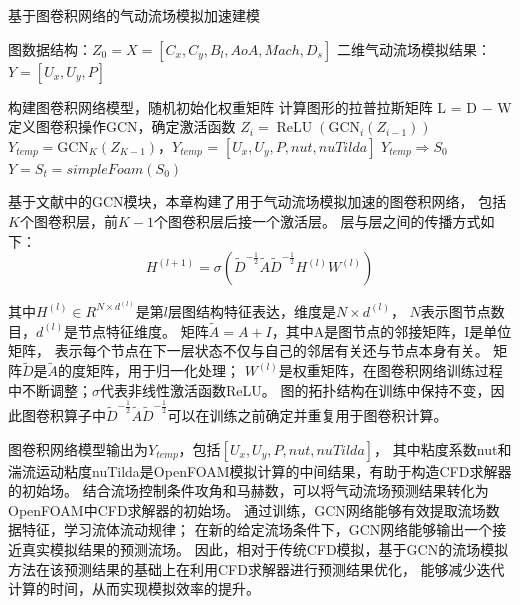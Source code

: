 \renewcommand{\algorithmicrequire}{\textbf{输入：}}
\renewcommand{\algorithmicensure}{\textbf{输出：}}
\begin{algorithm}[htbp]
	\caption{基于图卷积网络的气动流场模拟加速建模}
	\label{GCNflow}
	\begin{algorithmic}[1]
		\REQUIRE 图数据结构：$Z_{0} = X = [C_x, C_y, B_l, AoA, Mach, D_s]$ 
		\ENSURE  二维气动流场模拟结果：$Y = [ U_x,U_y, P]$
		
		\STATE 构建图卷积网络模型，随机初始化权重矩阵
		\STATE 计算图形的拉普拉斯矩阵 L = D − W
		\STATE 定义图卷积操作GCN，确定激活函数
		\STATE $Z_{i} = \operatorname{ReLU}\left(\mathrm{GCN}_{i}\left(Z_{i-1}\right)\right) $
		\ENDFOR
		\STATE $Y_{temp} = \mathrm{GCN}_{K}\left(Z_{K-1}\right)$，$Y_{temp}$ = $[ U_x,U_y, P, nut, nuTilda]$
		\STATE $Y_{temp} \Rightarrow S_0$ 
		\STATE $Y = S_t = simpleFoam(S_0)$  
	\end{algorithmic}
\end{algorithm}

基于文献\cite{2016Semi}中的GCN模块，本章构建了用于气动流场模拟加速的图卷积网络，
包括$K$个图卷积层，前$K-1$个图卷积层后接一个激活层。
层与层之间的传播方式如下：
\begin{equation}
H^{(l+1)}=\sigma\left(\tilde{D}^{-\frac{1}{2}} \tilde{A} \tilde{D}^{-\frac{1}{2}} H^{(l)} W^{(l)}\right)
\end{equation}

\noindent 其中$H^{(l)} \in R^{N \times d^{(l)}}$是第$l$层图结构特征表达，维度是$N \times d^{(l)}$，
$N$表示图节点数目，$d^{(l)}$是节点特征维度。
矩阵$\tilde{A} = A + I$，其中A是图节点的邻接矩阵，I是单位矩阵，
表示每个节点在下一层状态不仅与自己的邻居有关还与节点本身有关。
矩阵$\tilde{D}$是$\tilde{A}$的度矩阵，用于归一化处理；
$W^{(l)}$是权重矩阵，在图卷积网络训练过程中不断调整；$\sigma$代表非线性激活函数ReLU。
图的拓扑结构在训练中保持不变，因此图卷积算子中$\tilde{D}^{-\frac{1}{2}} \tilde{A} \tilde{D}^{-\frac{1}{2}}$可以在训练之前确定并重复用于图卷积计算。

图卷积网络模型输出为$Y_{temp}$，包括$[ U_x,U_y, P, nut, nuTilda]$，
其中粘度系数nut和湍流运动粘度nuTilda是OpenFOAM模拟计算的中间结果，有助于构造CFD求解器的初始场。
结合流场控制条件攻角和马赫数，可以将气动流场预测结果转化为OpenFOAM中CFD求解器的初始场。
通过训练，GCN网络能够有效提取流场数据特征，学习流体流动规律；
在新的给定流场条件下，GCN网络能够输出一个接近真实模拟结果的预测流场。
因此，相对于传统CFD模拟，基于GCN的流场模拟方法在该预测结果的基础上在利用CFD求解器进行预测结果优化，
能够减少迭代计算的时间，从而实现模拟效率的提升。


